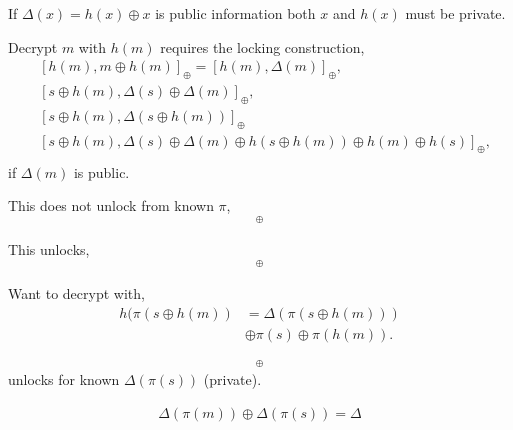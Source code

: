 \documentclass[twocolumn, aps, amsmath, amssymb, nofootinbib, superscriptaddress, longbibliography, doublefloatfix, table-of-contents, eqsecnum, rmp]{revtex4-2}
\begin{document}
If $\Delta(x)=h(x)\oplus x$ is public information both $x$ and $h(x)$ must be private.

Decrypt $m$ with $h(m)$ requires the locking construction,
\begin{align}
	&[h(m), m\oplus h(m)]_\oplus	= [h(m), \Delta(m)]_\oplus,\nonumber\\
	&[s\oplus h(m), \Delta(s) \oplus \Delta(m)]_\oplus,\nonumber\\
	&[s\oplus h(m), \Delta(s\oplus h(m))]_\oplus \nonumber\\
	&[s\oplus h(m), \Delta(s) \oplus \Delta(m) \oplus h(s\oplus h(m)) \oplus h(m) \oplus h(s)]_\oplus,\nonumber\\
\end{align}
if $\Delta(m)$ is public.


This does not unlock from known $\pi$,
\begin{align}
	[h(\pi(m)), \pi(m) \oplus h(m)]_\oplus
\end{align}

This unlocks,
\begin{align}
	[h(\pi(s \oplus m)), \Delta(s \oplus m)]_\oplus
\end{align}


Want to decrypt with,
\begin{align}
	h(\pi(s\oplus h(m)) &= \Delta(\pi(s\oplus h(m))) \nonumber\\
	&\oplus \pi(s) \oplus \pi(h(m)).
\end{align}

\begin{align}
	[h(m), \Delta(\pi(m))\oplus \Delta(\pi(s))]_\oplus
\end{align}
unlocks for known $\Delta(\pi(s))$ (private).

\begin{align}
	\Delta(\pi(m))\oplus \Delta(\pi(s))	= \Delta
\end{align}
\end{document}
